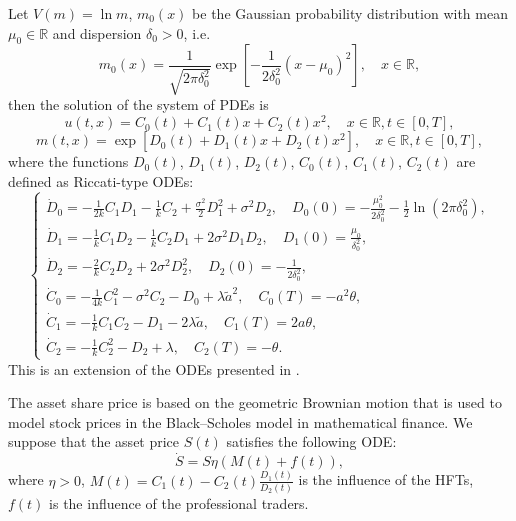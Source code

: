 \documentclass[12pt]{llncs}
\begin{document}
Let $V(m) = \ln m$, $m_0(x)$ be the Gaussian probability distribution with mean $\mu_0 \in \mathbb{R}$ and dispersion $\delta_0 > 0$, i.e.
\[
	m_0(x) = \frac{1}{\sqrt{2\pi \delta_0^2}}\exp\left[-\frac{1}{2\delta_0^2}(x - \mu_0)^2\right], \quad x \in \mathbb{R},
\]
then the solution of the system of PDEs is
\[
	u(t,x) = C_0(t) + C_1(t)x + C_2(t)x^2, \quad x \in \mathbb{R}, t \in [0,T],
\]
\[
	m(t,x) = \exp\left[D_0(t) + D_1(t)x + D_2(t)x^2\right], \quad x \in \mathbb{R}, t \in [0,T],
\]
where the functions $D_0(t)$, $D_1(t)$, $D_2(t)$, $C_0(t)$, $C_1(t)$, $C_2(t)$ are defined as Riccati-type ODEs:
\begin{equation}\label{trusov_reduction5}
	\left\{
	\begin{array}{ll}
		\dot{D}_0 = -\frac{1}{2k}C_1D_1 - \frac{1}{k}C_2 + \frac{\sigma^2}{2}D_1^2 + \sigma^2D_2, \quad D_0(0) = -\frac{\mu_0^2}{2\delta_0^2} - \frac{1}{2}\ln\left(2\pi \delta_0^2\right),\\
		\dot{D}_1 = -\frac{1}{k}C_1D_2 - \frac{1}{k}C_2D_1 + 2\sigma^2 D_1D_2, \quad D_1(0) = \frac{\mu_0}{\delta_0^2},\\
		\dot{D}_2 = -\frac{2}{k}C_2D_2 + 2\sigma^2D_2^2, \quad D_2(0) = -\frac{1}{2\delta_0^2},\\
		\dot{C}_0 = -\frac{1}{4k}C_1^2 - \sigma^2 C_2 - D_0 + \lambda\tilde{a}^2, \quad C_0(T) = -a^2\theta,\\
		\dot{C}_1 = -\frac{1}{k}C_1C_2 - D_1 - 2\lambda\tilde{a}, \quad C_1(T) = 2a\theta,\\
		\dot{C}_2 = -\frac{1}{k}C_2^2 - D_2 + \lambda, \quad C_2(T) = -\theta.
	\end{array}
	\right.
\end{equation}
This is an extension of the ODEs presented in \cite{FatoneMarianiRecchioniZirilli}. 

The asset share price is based on the geometric Brownian motion that is used to model stock prices in the Black--Scholes model in mathematical finance. We suppose that the asset price $S(t)$ satisfies the following ODE:
\begin{equation}\label{trusov_S}
	\dot{S} = S\eta\left(M(t) + f(t)\right),
\end{equation}
where $\eta > 0$, $M(t) = C_1(t) - C_2(t)\frac{D_1(t)}{D_2(t)}$ is the influence of the HFTs, $f(t)$ is the influence of the professional traders. 
\end{document}
